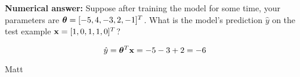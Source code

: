 \begin{parts}
\begin{subparts}
    \subpart[1] \textbf{Numerical answer:} Suppose after training the model for some time, your parameters are $\boldsymbol \theta = [-5, 4, -3, 2, -1]^T$. What is the model's prediction $\hat{y}$ on the test example $\mathbf{x} = [1, 0, 1, 1, 0]^T$?
    \begin{tcolorbox}[fit,height=1cm, width=2cm, blank, borderline={1pt}{-2pt}]
    \end{tcolorbox}
    \begin{soln}
    $$\hat{y} = \boldsymbol \theta^T\mathbf{x} = - 5 - 3 + 2 = -6$$
    \end{soln}
    \begin{qauthor}
    Matt
    \end{qauthor}
    
    \end{subparts}
    

\end{parts}